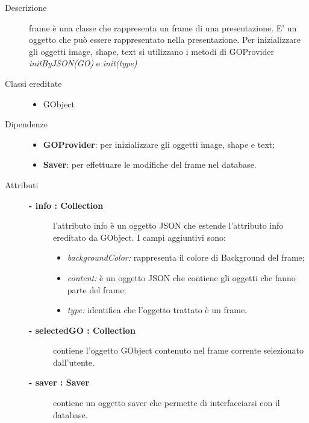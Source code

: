 \begin{description}
\item[Descrizione] \hfill
	frame è una classe che rappresenta un frame di una presentazione. E' un oggetto che può essere rappresentato nella presentazione. Per inizializzare gli oggetti image, shape, text si utilizzano i metodi di GOProvider \textit{initByJSON(GO)} e \textit{init(type)}
	
\item[Classi ereditate] \hfill
	\begin{itemize}
		\item GObject
	\end{itemize}

\item[Dipendenze] \hfill
	\begin{itemize}
		\item \textbf{GOProvider}: per inizializzare gli oggetti image, shape e text;
		\item \textbf{Saver}: per effettuare le modifiche del frame nel database.
	\end{itemize}

\item[Attributi] \hfill
	\begin{description}
		\item[\textbf{- info : Collection			}] \hfill
			l'attributo info è un oggetto JSON che estende l'attributo info ereditato da GObject. I campi aggiuntivi sono:
	\begin{itemize}
		\item \textit{backgroundColor:} rappresenta il colore di Background del frame;
		\item \textit{content:} è un oggetto JSON che contiene gli oggetti che fanno parte del frame;
		\item \textit{type:} identifica che l'oggetto trattato è un frame.
	\end{itemize}
	\end{description}
	\begin{description}
		\item[\textbf{- selectedGO : Collection			}] \hfill
			contiene l'oggetto GObject contenuto nel frame corrente selezionato dall'utente.  
	\end{description}
	\begin{description}
		\item[\textbf{- saver : Saver			}] \hfill
			contiene un oggetto saver che permette di interfacciarsi con il database.  
	\end{description}
	

\end{description}
